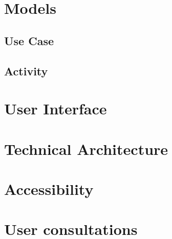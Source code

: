 \section{Models}


\subsection{Use Case}


\subsection{Activity}


\section{User Interface}


\section{Technical Architecture}


\section{Accessibility}


\section{User consultations}